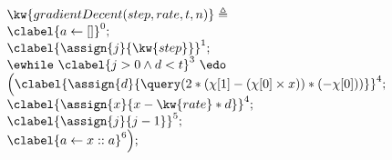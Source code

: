            
                  
                  
        \begin{example}
                  \[
                  \begin{array}{l}
                  \kw{gradientDecent(step, rate, t, n)} \triangleq \\
                         \clabel{ a \leftarrow []}^{0} ; \\
                          \clabel{\assign{j}{\kw{step}} }^{1} ; \\
                          \ewhile ~ \clabel{j > 0 \land d < t}^{3} ~ \edo ~ \\
                          \Big(
                              \clabel{\assign{d}{\query(2 * (\chi[1] - (\chi[0]\times x )) * (-\chi[0]))} }^{4}  ; \\
                              \clabel{\assign{x}{x - \kw{rate} * d} }^{4}  ; \\
                           \clabel{\assign{j}{j-1}}^{5} ;\\
                          \clabel{a \leftarrow x :: a}^{6} 
                          \Big);
                      \end{array}
                  \]
                  \end{example}    
    
